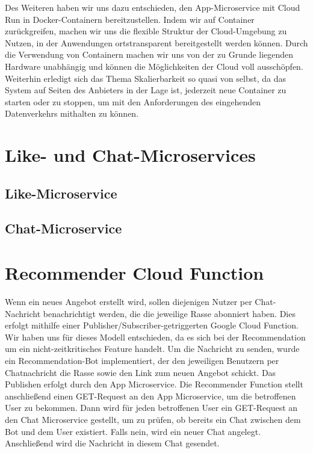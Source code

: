 \documentclass{article}
\begin{document}
Des Weiteren haben wir uns dazu entschieden, den App-Microservice mit Cloud Run in Docker-Containern bereitzustellen. Indem wir auf Container zurückgreifen, machen wir uns die flexible Struktur der Cloud-Umgebung zu Nutzen, in der Anwendungen ortstransparent bereitgestellt werden können. Durch die Verwendung von Containern machen wir uns von der zu Grunde liegenden Hardware unabhängig und können die Möglichkeiten der Cloud voll ausschöpfen. Weiterhin erledigt sich das Thema Skalierbarkeit so quasi von selbst, da das System auf Seiten des Anbieters in der Lage ist, jederzeit neue Container zu starten oder zu stoppen, um mit den Anforderungen des eingehenden Datenverkehrs mithalten zu können.

\section{Like- und Chat-Microservices} %

\subsection{Like-Microservice}

\subsection{Chat-Microservice}

\section{Recommender Cloud Function} %
Wenn ein neues Angebot erstellt wird, sollen diejenigen Nutzer per Chat-Nachricht benachrichtigt werden, die die jeweilige Rasse abonniert haben. Dies erfolgt mithilfe einer Publisher/Subscriber-getriggerten Google Cloud Function.
Wir haben uns für dieses Modell entschieden, da es sich bei der Recommendation um ein nicht-zeitkritisches Feature handelt.
Um die Nachricht zu senden, wurde ein Recommendation-Bot implementiert, der den jeweiligen Benutzern per Chatnachricht die Rasse sowie den Link zum neuen Angebot schickt.
Das Publishen erfolgt durch den App Microservice. Die Recommender Function stellt anschließend einen GET-Request an den App Microservice, um die betroffenen User zu bekommen. Dann wird für jeden betroffenen User ein GET-Request an den Chat Microservice gestellt, um zu prüfen, ob bereits ein Chat zwischen dem Bot und dem User existiert. Falls nein, wird ein neuer Chat angelegt. Anschließend wird die Nachricht in diesem Chat gesendet.
\end{document}
